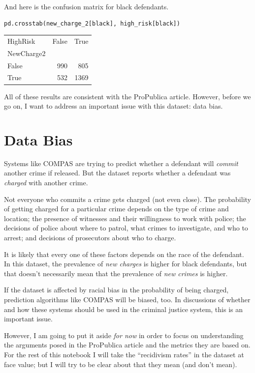 And here is the confusion matrix for black defendants.

\begin{lstlisting}[language=Python,style=source]
pd.crosstab(new_charge_2[black], high_risk[black])
\end{lstlisting}

\begin{tabular}{lrr}
\toprule
HighRisk &  False &  True  \\
NewCharge2 &        &        \\
\midrule
False      &    990 &    805 \\
True       &    532 &   1369 \\
\bottomrule
\end{tabular}

All of these results are consistent with the ProPublica article.
However, before we go on, I want to address an important issue with this
dataset: data bias.

\hypertarget{data-bias}{%
\section{Data Bias}\label{data-bias}}

Systems like COMPAS are trying to predict whether a defendant will
\emph{commit} another crime if released. But the dataset reports whether
a defendant was \emph{charged} with another crime.

Not everyone who commits a crime gets charged (not even close). The
probability of getting charged for a particular crime depends on the
type of crime and location; the presence of witnesses and their
willingness to work with police; the decisions of police about where to
patrol, what crimes to investigate, and who to arrest; and decisions of
prosecutors about who to charge.

It is likely that every one of these factors depends on the race of the
defendant. In this dataset, the prevalence of \emph{new charges} is
higher for black defendants, but that doesn't necessarily mean that the
prevalence of \emph{new crimes} is higher.

If the dataset is affected by racial bias in the probability of being
charged, prediction algorithms like COMPAS will be biased, too. In
discussions of whether and how these systems should be used in the
criminal justice system, this is an important issue.

However, I am going to put it aside \emph{for now} in order to focus on
understanding the arguments posed in the ProPublica article and the
metrics they are based on. For the rest of this notebook I will take the
``recidivism rates'' in the dataset at face value; but I will try to be
clear about that they mean (and don't mean).

